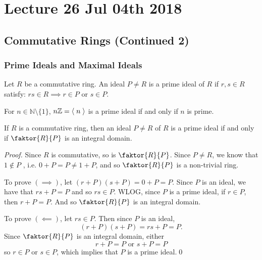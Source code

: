 \chapter{Lecture 26 Jul 04th 2018}%
\label{chp:lecture_26_jul_04th_2018}

\section{Commutative Rings (Continued 2)}%
\label{sec:commutative_rings_continued_2}

\subsection{Prime Ideals and Maximal Ideals}%
\label{sub:prime_ideals_and_maximal_ideals}

\begin{defn}
\label{defn:prime_ideals}
  Let $R$ be a commutative ring. An ideal $P \neq R$ is a prime ideal of $R$ if $r, s \in R$ satisfy: $rs \in R \implies r \in P$ or $s \in P$.
\end{defn}

\begin{eg}
  For $n \in \mathbb{N} \setminus \{1\}$, $n \mathbb{Z} = \langle \; n \; \rangle$ is a prime ideal if and only if $n$ is prime.
\end{eg}

\begin{propo}
\label{propo:ideal_is_prime_iff_quotient_of_ring_by_ideal_is_an_integral_domain}
If $R$ is a commutative ring, then an ideal $P \neq R$ of $R$ is a prime ideal if and only if $\faktor{R}{P}$ is an integral domain.
\end{propo}

\begin{proof}
  Since $R$ is commutative, so is $\faktor{R}{P}$. Since $P \neq R$, we know that $1 \notin P$ , i.e. $0 + P = P \neq 1 + P$, and so $\faktor{R}{P}$ is a non-trivial ring.

  \noindent To prove $(\implies)$, let $(r + P)(s + P) = 0 + P = P$. Since $P$ is an ideal, we have that $rs + P = P$ and so $rs \in P$. WLOG, since $P$ is a prime ideal, if $r \in P$, then $r + P = P$. And so $\faktor{R}{P}$ is an integral domain.

  \noindent To prove $(\impliedby)$, let $rs \in P$. Then since $P$ is an ideal,
  \begin{equation*}
    (r + P)(s + P) = rs + P = P.
  \end{equation*}
  Since $\faktor{R}{P}$ is an integral domain, either
  \begin{equation*}
    r + P = P \text{ or } s + P = P
  \end{equation*}
  so $r \in P$ or $s \in P$, which implies that $P$ is a prime ideal.\qed
\end{proof}

